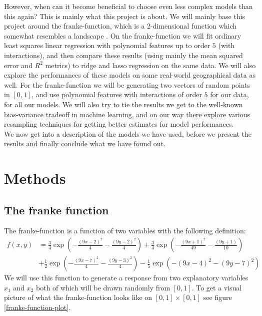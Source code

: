\documentclass{article}
\begin{document}
However, when can it become beneficial to choose even less complex models than
this again? This is mainly what this project is about. We will mainly base this
project around the franke-function, which is a 2-dimensional function which
somewhat resembles a landscape \cite{franke2ddesc}. On the franke-function we
will fit ordinary least squares linear regression with polynomial features up to
order $5$ (with interactions), and then compare these results (using mainly the
mean squared error and $R^2$ metrics) to ridge and lasso regression on the
same data. We will also explore the performances of these models on some
real-world geographical data as well. For the franke-function we will be
generating two vectors of random points in $\left[ 0, 1 \right]$, and use
polynomial features with interactions of order $5$ for our data, for all our
models. We will also try to tie the results we get to the well-known
bias-variance tradeoff in machine learning, and on our way there explore various
resampling techniques for getting better estimates for model performances.
\\

We now get into a description of the models we have used, before we present the
results and finally conclude what we have found out.

\section{Methods}
\subsection{The franke function}
The franke-function is a function of two variables with the following definition:
\begin{align*}
    f(x,y) & = \frac{3}{4}\exp{\left(-\frac{(9x-2)^2}{4} - \frac{(9y-2)^2}{4}\right)}+\frac{3}{4}\exp{\left(-\frac{(9x+1)^2}{49}- \frac{(9y+1)}{10}\right)} \\
           & +\frac{1}{2}\exp{\left(-\frac{(9x-7)^2}{4} - \frac{(9y-3)^2}{4}\right)} -\frac{1}{5}\exp{\left(-(9x-4)^2 - (9y-7)^2\right) }
\end{align*}
We will use this function to generate a response from two explanatory variables
$x_1$ and $x_2$ both of which will be drawn randomly from $\left[ 0, 1 \right]$.
To get a visual picture of what the franke-function looks like on $\left[ 0, 1
        \right] \times \left[ 0, 1 \right]$ see figure \ref{franke-function-plot}.
\end{document}
